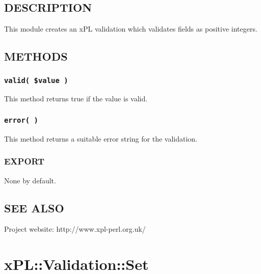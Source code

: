 \subsection*{DESCRIPTION\label{xPL::Validation::PositiveInteger_DESCRIPTION}}


This module creates an xPL validation which validates fields
as positive integers.

\subsection*{METHODS\label{xPL::Validation::PositiveInteger_METHODS}}
\subsubsection*{\texttt{valid( \$value )}\label{xPL::Validation::PositiveInteger_valid_value_}}


This method returns true if the value is valid.

\subsubsection*{\texttt{error( )}\label{xPL::Validation::PositiveInteger_error_}}


This method returns a suitable error string for the validation.

\subsubsection*{EXPORT\label{xPL::Validation::PositiveInteger_EXPORT}}


None by default.

\subsection*{SEE ALSO\label{xPL::Validation::PositiveInteger_SEE_ALSO}}


Project website: http://www.xpl-perl.org.uk/

\section{xPL::Validation::Set\label{xPL::Validation::Set}}



